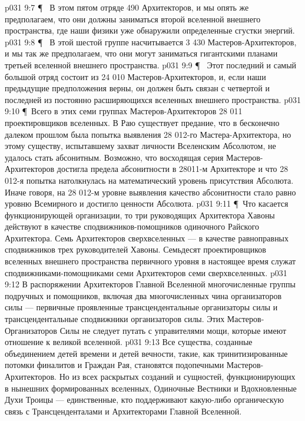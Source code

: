 \vs p031 9:7 \P\ \bibnobreakspace {} В этом пятом отряде 490 Архитекторов, и мы опять же предполагаем, что они должны заниматься второй вселенной внешнего пространства, где наши физики уже обнаружили определенные сгустки энергий.
\vs p031 9:8 \P\ \bibnobreakspace {} В этой шестой группе насчитывается 3 430 Мастеров\hyp{}Архитекторов, и мы так же предполагаем, что они могут заниматься гигантскими планами третьей вселенной внешнего пространства.
\vs p031 9:9 \P\ \bibnobreakspace {} Этот последний и самый большой отряд состоит из 24 010 Мастеров\hyp{}Архитекторов, и, если наши предыдущие предположения верны, он должен быть связан с четвертой и последней из постоянно расширяющихся вселенных внешнего пространства.
\vs p031 9:10 \P\ Всего в этих семи группах Мастеров\hyp{}Архитекторов 28 011 проектировщиков вселенных. В Раю существует предание, что в бесконечно далеком прошлом была попытка выявления 28 012\hyp{}го Мастера\hyp{}Архитектора, но этому существу, испытавшему захват личности Вселенским Абсолютом, не удалось стать абсонитным. Возможно, что восходящая серия Мастеров\hyp{}Архитекторов достигла предела абсонитности в 28011\hyp{}м Архитекторе и что 28 012\hyp{}я попытка натолкнулась на математический уровень присутствия Абсолюта. Иначе говоря, на 28 012\hyp{}м уровне выявления качество абсонитности стало равно уровню Всемирного и достигло ценности Абсолюта.
\vs p031 9:11 \P\ Что касается функционирующей организации, то три руководящих Архитектора Хавоны действуют в качестве сподвижников\hyp{}помощников одиночного Райского Архитектора. Семь Архитекторов сверхвселенных --- в качестве равноправных сподвижников трех руководителей Хавоны. Семьдесят проектировщиков вселенных внешнего пространства первичного уровня в настоящее время служат сподвижниками\hyp{}помощниками семи Архитекторов семи сверхвселенных.
\vs p031 9:12 В распоряжении Архитекторов Главной Вселенной многочисленные группы подручных и помощников, включая два многочисленных чина организаторов силы --- первичные проявленные трансцендентальные организаторы силы и трансцендентальные сподвижники организаторов силы. Этих Мастеров\hyp{}Организаторов Силы не следует путать с управителями мощи, которые имеют отношение к великой вселенной.
\vs p031 9:13 Все существа, созданные объединением детей времени и детей вечности, такие, как тринитизированные потомки финалитов и Граждан Рая, становятся подопечными Мастеров\hyp{}Архитекторов. Но из всех раскрытых созданий и сущностей, функционирующих в нынешних формированных вселенных, Одиночные Вестники и Вдохновленные Духи Троицы --- единственные, кто поддерживают какую\hyp{}либо органическую связь с Трансценденталами и Архитекторами Главной Вселенной.
